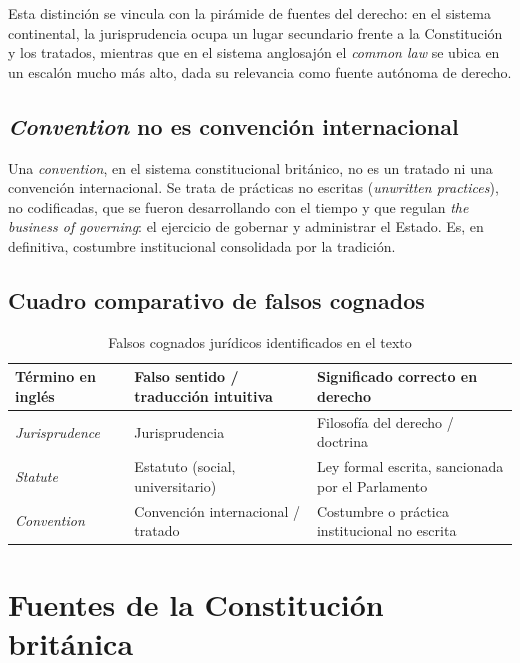 \documentclass[12pt,oneside]{book}
\begin{document}
Esta distinción se vincula con la pirámide de fuentes del derecho: en el sistema continental, la jurisprudencia ocupa un lugar secundario frente a la Constitución y los tratados, mientras que en el sistema anglosajón el \emph{common law} se ubica en un escalón mucho más alto, dada su relevancia como fuente autónoma de derecho.

\section{\emph{Convention} no es convención internacional}

\begin{important}
Una \emph{convention}, en el sistema constitucional británico, no es un tratado ni una convención internacional. Se trata de prácticas no escritas (\emph{unwritten practices}), no codificadas, que se fueron desarrollando con el tiempo y que regulan \emph{the business of governing}: el ejercicio de gobernar y administrar el Estado. Es, en definitiva, costumbre institucional consolidada por la tradición.
\end{important}

\section{Cuadro comparativo de falsos cognados}

\begin{table}[H]
\centering
\caption{Falsos cognados jurídicos identificados en el texto}
\begin{tabularx}{\textwidth}{
    >{\raggedright\arraybackslash}p{}
    >{\raggedright\arraybackslash}p{}
    >{\raggedright\arraybackslash}X
}
\toprule
\textbf{Término en inglés} & \textbf{Falso sentido / traducción intuitiva} & \textbf{Significado correcto en derecho} \\
\midrule
\emph{Jurisprudence} & Jurisprudencia & Filosofía del derecho / doctrina \\
\emph{Statute} & Estatuto (social, universitario) & Ley formal escrita, sancionada por el Parlamento \\
\emph{Convention} & Convención internacional / tratado & Costumbre o práctica institucional no escrita \\
\bottomrule
\end{tabularx}
\end{table}

\chapter{Fuentes de la Constitución británica}
\end{document}
